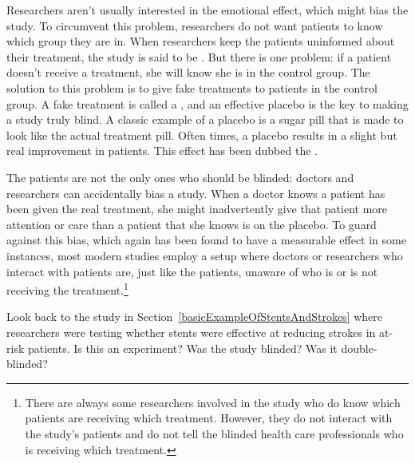 Researchers aren't usually interested in the emotional effect,
which might bias the study.
To circumvent this problem, researchers do not want patients
to know which group they are in.
When researchers keep the patients uninformed about their
treatment, the study is said to be .
But there is one problem:
if a patient doesn't receive a treatment, she will know she
is in the control group.
The solution to this problem is to give fake treatments to
patients in the control group.
A fake treatment is called a , and an effective
placebo is the key to making a study truly blind.
A classic example of a placebo is a sugar pill that is made
to look like the actual treatment pill.
Often times, a placebo results in a slight but real
improvement in patients.
This effect has been dubbed the .

The patients are not the only ones who should be blinded:
doctors and researchers can accidentally bias a study.
When a doctor knows a patient has been given the real treatment,
she might inadvertently give that patient more attention or care
than a patient that she knows is on the placebo.
To guard against this bias, which again has been found to have
a measurable effect in some instances, most modern studies employ
a  setup where doctors or researchers who
interact with patients are, just like the patients,
unaware of who is or is not receiving the
treatment.\footnote{There are always some researchers involved
  in the study who do know which patients are receiving which
  treatment.
  However, they do not interact with the study's patients and
  do not tell the blinded health care professionals who is
  receiving which treatment.}

\begin{exercisewrap}
\begin{nexercise}
Look back to the study in Section~\ref{basicExampleOfStentsAndStrokes} where researchers were testing whether stents were effective at reducing strokes in at-risk patients. Is this an experiment? Was the study blinded? Was it double-blinded?\footnotemark{}
\end{nexercise}
\end{exercisewrap}

\noindent{}

